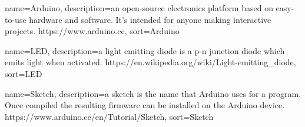 %
{
  name={Arduino},
  description={an open-source electronics platform based on easy-to-use hardware and software. It's intended for anyone making interactive projects. https://www.arduino.cc},
  sort=Arduino
}
%

%
{
	name={LED},
	description={a light emitting diode is a p-n junction diode which emits light when activated. https://en.wikipedia.org/wiki/Light-emitting\_diode},
	sort=LED
}
%

%
{
	name={Sketch},
	description={a sketch is the name that Arduino uses for a program. Once compiled the resulting firmware can be installed on the Arduino device. https://www.arduino.cc/en/Tutorial/Sketch},
	sort=Sketch
}
%
